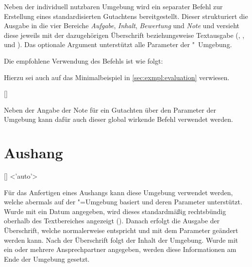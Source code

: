 \begin{DeclareEntity}{}
\begin{Declaration}
Neben der individuell nutzbaren Umgebung  wird ein 
separater Befehl zur Erstellung eines standardisierten Gutachtens 
bereitgestellt. Dieser strukturiert die Ausgabe in die vier Bereiche 
\emph{Aufgabe}, \emph{Inhalt}, \emph{Bewertung} und \emph{Note} und versieht 
diese jeweils mit der dazugehörigen Überschrift beziehungsweise Textausgabe 
(, ,  und 
). Das optionale Argument unterstützt alle Parameter der 
"~Umgebung.
\end{Declaration}
%
\begin{Example}
Die empfohlene Verwendung des Befehls  ist wie folgt:
\begin{Code}
\end{Code}
Hierzu sei auch auf das Minimalbeispiel in \autoref{sec:exmpl:evaluation} 
verwiesen.%
%
\end{Example}

\begin{Declaration}
  {[]}
\printdeclarationlist

Neben der Angabe der Note für ein Gutachten über den Parameter 
 der Umgebung  
kann dafür auch dieser global wirkende Befehl verwendet werden.
\end{Declaration}



\section{%
  Aushang%
}

\begin{Declaration}
  {[]}
  <'auto'>
\begin{Declaration}
  {}
\printdeclarationlist

Für das Anfertigen eines Aushangs kann diese Umgebung verwendet werden, welche
abermals auf der "=Umgebung basiert und deren Parameter 
unterstützt. Wurde mit  ein Datum angegeben, wird dieses 
standardmäßig rechtsbündig oberhalb des Textbereiches angezeigt 
(). Danach erfolgt die Ausgabe der 
Überschrift, welche normalerweise  entspricht und mit dem 
Parameter  geändert werden kann. Nach der 
Überschrift folgt der Inhalt der Umgebung. Wurde mit  ein 
oder mehrere Ansprechpartner angegeben, werden diese Informationen am Ende der 
Umgebung gesetzt.
\end{Declaration}
\end{Declaration}


\end{DeclareEntity}
